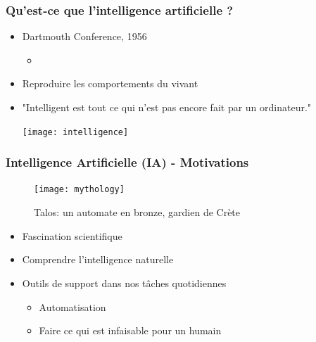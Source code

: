 \begin{frame}
  \frametitle{Qu'est-ce que l'intelligence artificielle ?}
  \pause
  \begin{itemize}
  \item Dartmouth Conference, 1956
    \begin{itemize}
    \item[] {} 
    \end{itemize}
  \item Reproduire  les comportements du vivant
     \pause
  \item {} "Intelligent est tout ce qui n'est pas encore fait par un ordinateur."\pause

  \centerline{\texttt{[image: intelligence]}}

  \end{itemize}
\end{frame}

\begin{frame}
  \frametitle{Intelligence Artificielle (IA) - Motivations}
   \begin{figure}
     \texttt{[image: mythology]}
     \caption{Talos: un automate en bronze, gardien de Crète}
   \end{figure}

  \begin{itemize}

  \item Fascination scientifique
  \item Comprendre l'intelligence naturelle
  \item Outils de support dans nos tâches quotidiennes
  \begin{itemize}
    \item Automatisation
    \item Faire ce qui est infaisable pour un humain
  \end{itemize}
  \end{itemize}
\end{frame}


